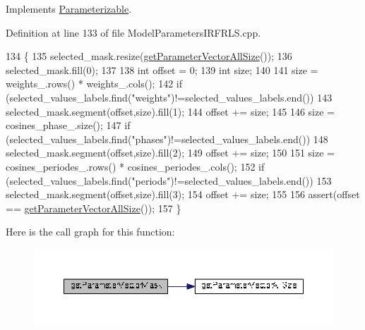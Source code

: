 Implements \hyperlink{classDmpBbo_1_1Parameterizable_ae7f6cbc5723ed4734ded5f2ba59bd366}{Parameterizable}.



Definition at line 133 of file Model\+Parameters\+I\+R\+F\+R\+L\+S.\+cpp.


\begin{DoxyCode}
134 \{
135   selected\_mask.resize(\hyperlink{classDmpBbo_1_1ModelParametersIRFRLS_ab24d2485b3b795b516f4844f225100eb}{getParameterVectorAllSize}());
136   selected\_mask.fill(0);
137   
138   \textcolor{keywordtype}{int} offset = 0;
139   \textcolor{keywordtype}{int} size;
140   
141   size = weights\_.rows() * weights\_.cols();
142   \textcolor{keywordflow}{if} (selected\_values\_labels.find(\textcolor{stringliteral}{"weights"})!=selected\_values\_labels.end())
143     selected\_mask.segment(offset,size).fill(1);
144   offset += size;
145   
146   size =  cosines\_phase\_.size();
147   \textcolor{keywordflow}{if} (selected\_values\_labels.find(\textcolor{stringliteral}{"phases"})!=selected\_values\_labels.end())
148     selected\_mask.segment(offset,size).fill(2);
149   offset += size;
150   
151   size = cosines\_periodes\_.rows() * cosines\_periodes\_.cols();
152   \textcolor{keywordflow}{if} (selected\_values\_labels.find(\textcolor{stringliteral}{"periods"})!=selected\_values\_labels.end())
153     selected\_mask.segment(offset,size).fill(3);
154   offset += size;
155   
156   assert(offset == \hyperlink{classDmpBbo_1_1ModelParametersIRFRLS_ab24d2485b3b795b516f4844f225100eb}{getParameterVectorAllSize}()); 
157 \}
\end{DoxyCode}


Here is the call graph for this function\+:
\nopagebreak
\begin{figure}[H]
\begin{center}
\leavevmode
\includegraphics[width=350pt]{classDmpBbo_1_1ModelParametersIRFRLS_a9dba1f93e426e7511630ec1ece4ace17_cgraph}
\end{center}
\end{figure}


